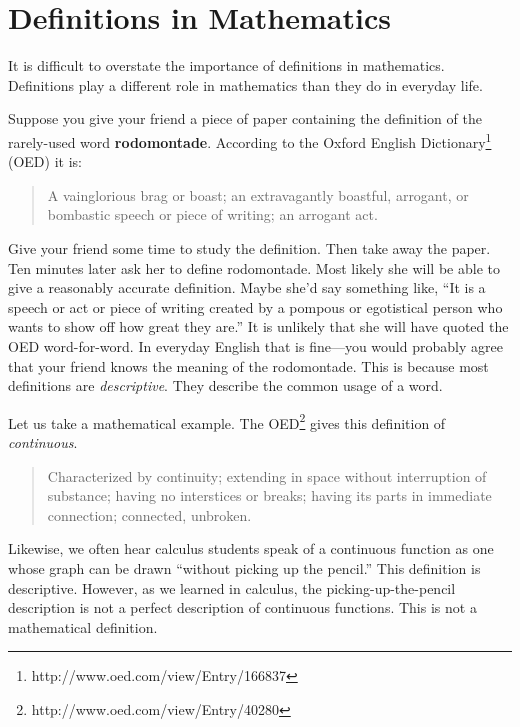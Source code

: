\chapter{Definitions in Mathematics}
\label{appendix:definitions}

It is difficult to overstate the importance of definitions in mathematics. Definitions play a different role in mathematics than they do in everyday life. 

Suppose you give your friend a piece of paper containing the definition of the rarely-used word \textbf{rodomontade}. According to the Oxford English Dictionary\footnote{http://www.oed.com/view/Entry/166837} (OED) it is:
\begin{quote}
A vainglorious brag or boast; an extravagantly boastful, arrogant, or bombastic speech or piece of writing; an arrogant act.
\end{quote}
Give your friend some time to study the definition. Then take away the paper. Ten minutes later ask her to define rodomontade. Most likely she will be able to give a reasonably accurate definition. Maybe she'd say something like, ``It is a speech or act or piece of writing created by a pompous or egotistical person who wants to show off how great they are.'' It is unlikely that she will have quoted the OED word-for-word. In everyday English that is fine---you would probably agree that your friend knows the meaning of the rodomontade. This is because most definitions are \emph{descriptive}. They describe the common usage of a word. 

Let us take a mathematical example. The OED\footnote{http://www.oed.com/view/Entry/40280}  gives this definition of \emph{continuous}.
\begin{quote}
Characterized by continuity; extending in space without interruption of substance; having no interstices or breaks; having its parts in immediate connection; connected, unbroken.
\end{quote}
Likewise, we often hear calculus students speak of a continuous function as one whose graph can be drawn ``without picking up the pencil.'' This definition is descriptive. However, as we learned in calculus, the picking-up-the-pencil description is not a perfect description of continuous functions. This is not a mathematical definition. 

